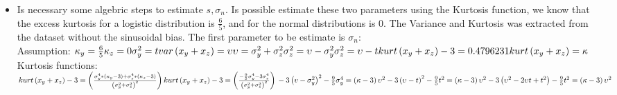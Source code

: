\documentclass[conference]{IEEEtran}
\begin{document}
\begin{itemize}
\bigskip
\item Is necessary some algebric steps to estimate \begin{math} s, \sigma_n \end{math}. Is possible estimate these two parameters using the Kurtosis function, we know that the excess kurtosis for a logistic distribution is \begin{math} \frac{6}{5} \end{math}, and for the normal distributions is 0. The Variance and Kurtosis was extracted from the dataset without the sinusoidal bias.  The first parameter to be estimate is \( \sigma_n \): 
\bigskip
	\\ Assumption:
	 \begin{math} 
 		\\
		\kappa_y =  \frac{6}{5}  \\
 		\kappa_z = 0 \\
	    \sigma_y^2 =  t \\
	    var \left( x_y + x_z \right)  =   \upsilon  \\
	    \upsilon  =  \sigma_y^2 + \sigma_z^2 \\
	    \sigma_z^2 =  \upsilon -\sigma_y^2 \\
	    \sigma_z^2 =  \upsilon -t \\
	    kurt\left( x_y + x_z \right) - 3= 0.4796231 \\
	    kurt\left( x_y + x_z \right) = \kappa    
	    \\	 
	  \end{math} 	  
	  \\Kurtosis functions:\\   
	  \begin{math}   
		kurt\left( x_y + x_z \right) -3 = \left( \frac{  {\sigma_y^4}* \left( \kappa_y -3 \right) 
		+{\sigma_z^4}* \left( \kappa_z -3 \right) }
       {\left(  {\sigma_y^2} + {\sigma_z^2} \right)^2 }\right)  \\
kurt\left( x_y + x_z \right) -3 = \left(
 \frac{- \frac{9 }{5}   {\sigma_y^4} -3{\sigma_z^4}  } 
      { \left({\sigma_y^2} + {\sigma_z^2} \right)^2}
\right) \\
-3 \left( v - {\sigma_y^2}  \right)^2  - \frac{9}{5}   {\sigma_y^4} =  \left(  \kappa -3\right) \upsilon ^2  \\
-3 \left(  \upsilon   -t  \right)^2 - \frac{9}{5} t^2   =  \left(  \kappa -3\right) \upsilon^2  \\
-3 \left( \upsilon^2 -2   \upsilon  t + t^2   \right) -\frac{9}{5} t^2 =  \left( \kappa -3\right) \upsilon^2  \\

\end{math}
\end{itemize}
\end{document}
